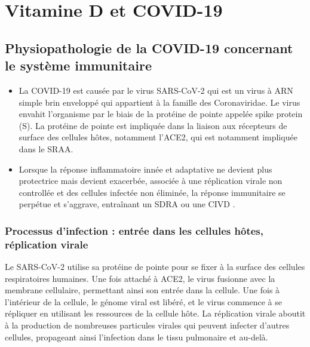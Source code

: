 \documentclass[
  a4paper,
  DIV=11,
  numbers=noendperiod,
  listof=totoc]{scrreprt}
\begin{document}
\chapter{Vitamine D et COVID-19}\label{vitamine-d-et-covid-19}

\section{Physiopathologie de la COVID-19 concernant le système
immunitaire}\label{physiopathologie-de-la-covid-19-concernant-le-systuxe8me-immunitaire}

\begin{itemize}
\item
  La \ac{COVID-19} est causée par le virus \ac{SARS-CoV-2} qui est un
  virus à ARN simple brin enveloppé qui appartient à la famille des
  Coronaviridae. Le virus envahit l'organisme par le biais de la
  protéine de pointe appelée spike protein (S). La protéine de pointe
  est impliquée dans la liaison aux récepteurs de surface des cellules
  hôtes, notamment l'\ac{ACE2}, qui est notamment impliquée dans le
  \ac{SRAA}.
\item
  Lorsque la réponse inflammatoire innée et adaptative ne devient plus
  protectrice mais devient exacerbée, associée à une réplication virale
  non controllée et des cellules infectée non éliminée, la réponse
  immunitaire se perpétue et s'aggrave, entraînant un \ac{SDRA} ou une
  \ac{CIVD} \autocite{Contreras-Bolívar.2023}.
\end{itemize}

\subsection{Processus d'infection : entrée dans les cellules hôtes,
réplication
virale}\label{processus-dinfection-entruxe9e-dans-les-cellules-huxf4tes-ruxe9plication-virale}

Le \ac{SARS-CoV-2} utilise sa protéine de pointe pour se fixer à la
surface des cellules respiratoires humaines. Une fois attaché à
\ac{ACE2}, le virus fusionne avec la membrane cellulaire, permettant
ainsi son entrée dans la cellule. Une fois à l'intérieur de la cellule,
le génome viral est libéré, et le virus commence à se répliquer en
utilisant les ressources de la cellule hôte. La réplication virale
aboutit à la production de nombreuses particules virales qui peuvent
infecter d'autres cellules, propageant ainsi l'infection dans le tissu
pulmonaire et au-delà.
\end{document}
